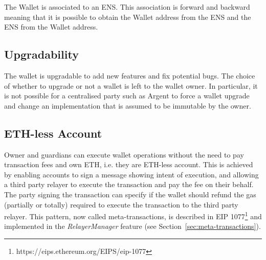 \documentclass[12pt]{article}
\begin{document}
The Wallet is associated to an ENS. This association is forward and backward meaning that it is possible to obtain the Wallet address from the ENS and the ENS from the Wallet address.

\subsection{Upgradability}

The wallet is upgradable to add new features and fix potential bugs. The choice of whether to upgrade or not a wallet is left to the wallet owner. In particular, it is not possible for a centralised party such as Argent to force a wallet upgrade and change an implementation that is assumed to be immutable by the owner.

\subsection{ETH-less Account}
\label{sec:eth-less-account}

Owner and guardians can execute wallet operations without the need to pay transaction fees and own ETH, i.e. they are ETH-less account. This is achieved by enabling accounts to sign a message showing intent of execution, and allowing a third party relayer to execute the transaction and pay the fee on their behalf. The party signing the transaction can specify if the wallet should refund the gas (partially or totally) required to execute the transaction to the third party relayer. This pattern, now called meta-transactions, is described in EIP 1077\footnote{https://eips.ethereum.org/EIPS/eip-1077} and implemented in the \emph{RelayerManager} feature (see Section~\ref{sec:meta-transactions}). 

\end{document}
